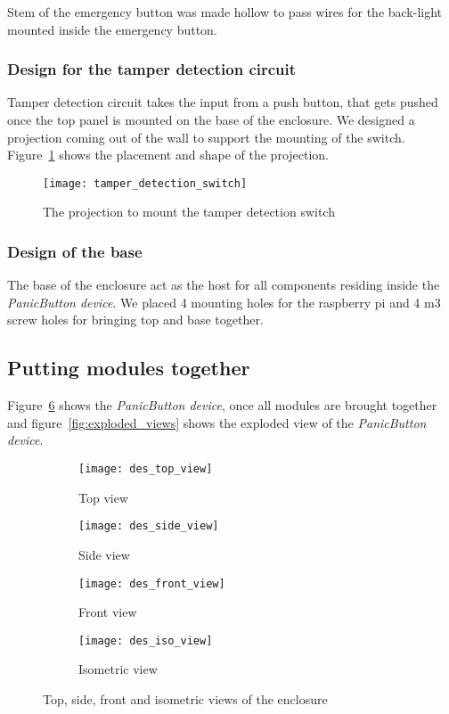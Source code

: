 Stem of the emergency button was made hollow to pass wires for the back-light mounted inside the emergency button.
 
\subsubsection{Design for the tamper detection circuit}
Tamper detection circuit takes the input from a push button, that gets pushed once the top panel is mounted on the base of the enclosure. We designed a projection coming out of the wall to support the mounting of the switch. Figure~\ref{fig:tamper_detection_switch} shows the placement and shape of the projection.

\begin{figure}[H]
\centering
\texttt{[image: tamper\_detection\_switch]}
\caption{The projection to mount the tamper detection switch}
\label{fig:tamper_detection_switch}
\end{figure}  

\subsubsection{Design of the base}
The base of the enclosure act as the host for all components residing inside the \emph{PanicButton device}. We placed 4 mounting holes for the raspberry pi and 4 m3 screw holes for bringing top and base together.

\subsection{Putting modules together}
\label{sec:desIndust}
Figure~\ref{fig:des_views} shows the \emph{PanicButton device}, once all modules are brought together and figure~\ref{fig:exploded_views} shows the exploded view of the \emph{PanicButton device}.  
\begin{figure}[H]
\begin{subfigure}{.5\textwidth}
  \centering
  \texttt{[image: des\_top\_view]}
  \caption{Top view}
  \label{fig:des_top_view}
\end{subfigure}%
\begin{subfigure}{.5\textwidth}
  \centering
  \texttt{[image: des\_side\_view]}
  \caption{Side view}
  \label{fig:des_side_view}
\end{subfigure}
\begin{subfigure}{.5\textwidth}
  \centering
  \texttt{[image: des\_front\_view]}
  \caption{Front view}
  \label{fig:des_side_view2}
\end{subfigure}%
\begin{subfigure}{.5\textwidth}
  \centering
  \texttt{[image: des\_iso\_view]}
  \caption{Isometric view}
  \label{fig:des_iso_view}
\end{subfigure}
\caption{Top, side, front and isometric views of the enclosure}
\label{fig:des_views}
\end{figure}

